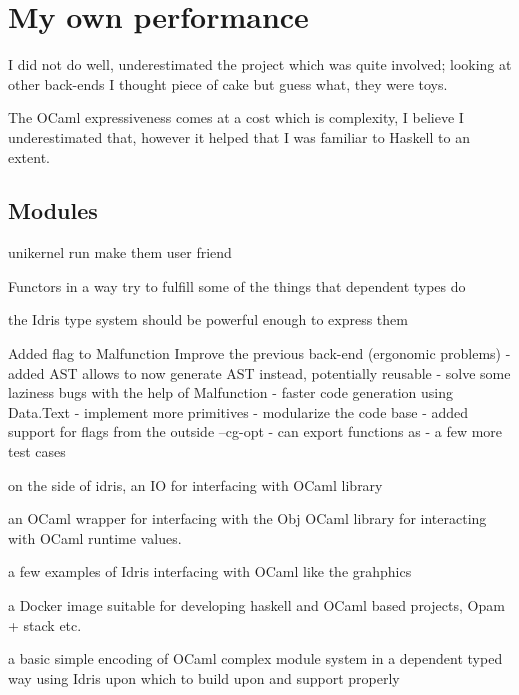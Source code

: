 \citep{blackholes}
\citep{Abedon1994}
\citep{AbedonHymanThomas2003}
\citep{website:fermentas-lambda}


\section{My own performance }
I did not do well, underestimated the project
which was quite involved; looking at other back-ends 
I thought piece of cake but guess what, they were
toys. 

The OCaml expressiveness comes at a cost which is complexity,
I believe I underestimated that, however it helped that
I was familiar to Haskell to an extent. 


\subsection{Modules}
unikernel run
make them user friend

Functors in a way try to fulfill some of the things that
dependent types do


the Idris type system should be powerful enough to express them

Added flag to Malfunction
Improve the previous back-end  (ergonomic problems)
- added AST allows to now generate AST instead, potentially reusable
- solve some laziness bugs with the help of Malfunction
- faster code generation using Data.Text
- implement more primitives
- modularize the code base
- added support for flags from the outside --cg-opt
- can export functions as
- a few more test cases

on the side of idris, an IO for interfacing with OCaml library

an OCaml wrapper for interfacing with the Obj OCaml library for
interacting with OCaml runtime values.

a few examples of Idris interfacing with OCaml like the
grahphics

a Docker image suitable for developing haskell and OCaml
based projects, Opam + stack etc.

a basic simple encoding of OCaml complex module system in
a dependent typed way using Idris upon which to build
upon and support properly
